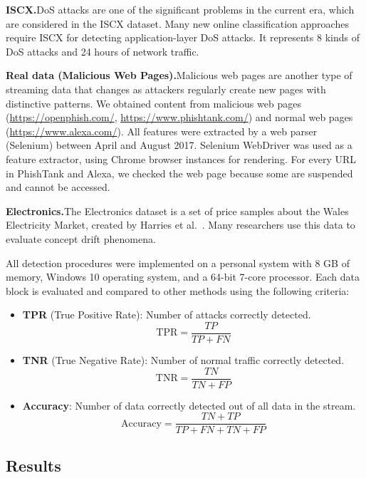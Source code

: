 \documentclass[12pt,a4paper]{article}
\begin{document}
	\medskip
	\noindent\textbf{ISCX.}\quad DoS attacks are one of the significant problems in the current era, which are considered in the ISCX dataset. Many new online classification approaches require ISCX for detecting application-layer DoS attacks. It represents 8 kinds of DoS attacks and 24 hours of network traffic.
	
	\medskip
	\noindent\textbf{Real data (Malicious Web Pages).}\quad Malicious web pages are another type of streaming data that changes as attackers regularly create new pages with distinctive patterns. We obtained content from malicious web pages (\url{https://openphish.com/}, \url{https://www.phishtank.com/}) and normal web pages (\url{https://www.alexa.com/}). All features were extracted by a web parser (Selenium) between April and August 2017. Selenium WebDriver was used as a feature extractor, using Chrome browser instances for rendering. For every URL in PhishTank and Alexa, we checked the web page because some are suspended and cannot be accessed.
	
	\medskip
	\noindent\textbf{Electronics.}\quad The Electronics dataset is a set of price samples about the Wales Electricity Market, created by Harries et al.~\cite{Harries1999}. Many researchers use this data to evaluate concept drift phenomena.
	
	\medskip
	All detection procedures were implemented on a personal system with 8 GB of memory, Windows 10 operating system, and a 64-bit 7-core processor. Each data block is evaluated and compared to other methods using the following criteria:
	
	\begin{itemize}
		\item \textbf{TPR} (True Positive Rate): Number of attacks correctly detected.
		\[
		\mathrm{TPR} = \frac{TP}{TP + FN}
		\]
		\item \textbf{TNR} (True Negative Rate): Number of normal traffic correctly detected.
		\[
		\mathrm{TNR} = \frac{TN}{TN + FP}
		\]
		\item \textbf{Accuracy}: Number of data correctly detected out of all data in the stream.
		\[
		\mathrm{Accuracy} = \frac{TN + TP}{TP + FN + TN + FP}
		\]
	\end{itemize}
	
	\subsection{Results}
	
\end{document}
